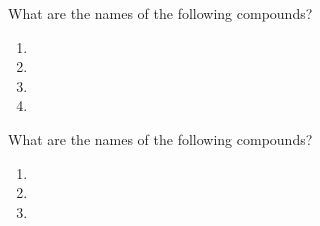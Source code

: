 \documentclass[notes=onlyslideswithnotes,notes=hide]{beamer}
\begin{document}
\begin{inclass}
	What are the names of the following compounds?

	\begin{enumerate}
		\item {}
		\item {}
		\item {}
		\item {}
	\end{enumerate}
\end{inclass}

\begin{onyourown}[4em]
	What are the names of the following compounds?

	\begin{enumerate}
		\item {}
		\item {}
		\item {}
	\end{enumerate}
\end{onyourown}
\end{document}
